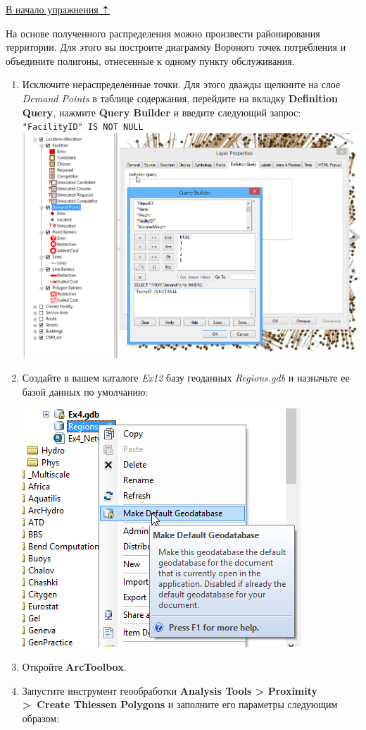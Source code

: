 \documentclass[]{book}
\theoremstyle{definition}
\theoremstyle{definition}
\theoremstyle{definition}
\theoremstyle{remark}
\begin{document}
\protect\hyperlink{network-analysis}{В начало упражнения ⇡}

На основе полученного распределения можно произвести районирования
территории. Для этого вы построите диаграмму Вороного точек потребления
и объедините полигоны, отнесенные к одному пункту обслуживания.

\begin{enumerate}
\def\labelenumi{\arabic{enumi}.}
\item
  Исключите нераспределенные точки. Для этого дважды щелкните на слое
  \emph{Demand Points} в таблице содержания, перейдите на вкладку
  \textbf{Definition Query}, нажмите \textbf{Query Builder} и введите
  следующий запрос: \texttt{"FacilityID"\ IS\ NOT\ NULL}
  \includegraphics{images/Ex12/image28.png}
\item
  Создайте в вашем каталоге \emph{Ex12} базу геоданных
  \emph{Regions.gdb} и назначьте ее базой данных по умолчанию:

  \includegraphics{images/Ex12/image29.png}
\item
  Откройте \textbf{ArcToolbox}.
\item
  Запустите инструмент геообработки \textbf{Analysis Tools
  \textgreater{} Proximity \textgreater{}~Create Thiessen Polygons} и
  заполните его параметры следующим образом:


\end{enumerate}
\end{document}
